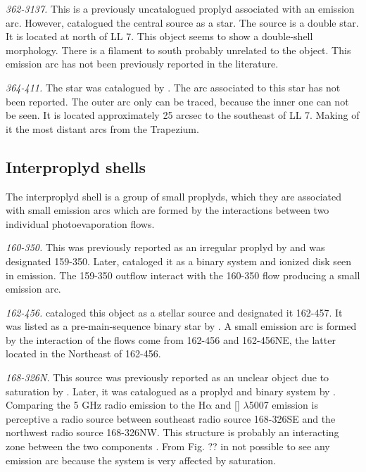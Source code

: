 \documentclass[apj, twocolumn]{aastex63}
\newcommand\oiii{[\ion{O}{3}]}
\newcommand\ha{\ensuremath{\mathrm{H\alpha}}}
\renewcommand\clearpage{}
\begin{document}
\textit{362-3137.} This is a previously uncatalogued proplyd associated
with an emission arc. However, \citet{Da-Rio:2009a} catalogued the
central source as a star. The source is a double star. It is located at
north of LL 7. This object seems to show a double-shell morphology.
There is a filament to south probably unrelated to the object. This
emission arc has not been previously reported in the literature.

\textit{364-411.} The star was catalogued by \citet{Hillenbrand:1997}.
The arc associated to this star has not been reported. The outer
arc only can be traced, because the inner one can not be seen.
It is located approximately 25 arcsec to the southeast of LL 7.
Making of it the most distant arcs from the Trapezium.

\clearpage
\subsection{Interproplyd shells}
\label{sec:interproplyd-group}



The interproplyd shell is a  group of small proplyds, which they are
associated with small emission arcs which are formed by the interactions
between two individual photoevaporation flows.
    
\textit{160-350.} This was previously reported as an irregular proplyd
by \citet{ODell:1994a} and was designated 159-350. Later, \citet{Ricci:2008a}
cataloged it as a binary system and ionized disk seen in emission.
The 159-350 outflow interact with the 160-350 flow producing a small
emission arc.  

\textit{162-456.} \citet{ODell:1996a} cataloged this object as a stellar
source and designated it 162-457. It was listed as a pre-main-sequence
binary star by \citet{Reipurth:2007a}. A small emission arc is formed by
the interaction of the flows come from 162-456 and 162-456NE, the latter
located in the Northeast of 162-456.     

\textit{168-326N.} This source was previously reported as an unclear object
due to saturation by \citet{ODell:1994a}. Later, it was catalogued as a proplyd
and binary system by \citet{Ricci:2008a}. Comparing the 5 GHz radio emission
to the \ha{} and \oiii{} $\lambda$5007 emission is perceptive a radio source
between southeast radio source 168-326SE and the northwest radio source
168-326NW. This structure is probably an interacting zone between the two
components \citep{Graham:2002a}. From Fig. ?? in not possible to see
any emission arc because the system is very affected by saturation.    
\end{document}
